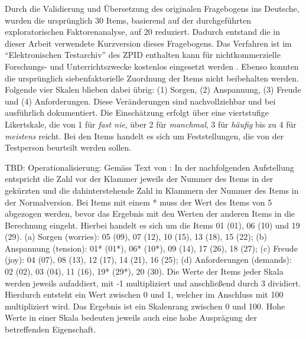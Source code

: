 Durch die Validierung und Übersetzung des originalen Fragebogens ins Deutsche, wurden die ursprünglich 30 Items, basierend auf der durchgeführten exploratorischen Faktorenanalyse, auf 20 reduziert. Dadurch entstand die in dieser Arbeit verwendete Kurzversion dieses Fragebogens. Das Verfahren ist im \enquote{Elektronischen Testarchiv} des ZPID enthalten kann für nichtkommerzielle Forschungs- und Unterrichtszwecke kostenlos eingesetzt werden \cite{ZPID}. Ebenso konnten die ursprünglich siebenfaktorielle Zuordnung der Items nicht beibehalten werden. Folgende vier Skalen blieben dabei übrig: (1) Sorgen, (2) Anspannung, (3) Freude und (4) Anforderungen. Diese Veränderungen sind nachvollziehbar und bei  ausführlich dokumentiert. Die Einschätzung erfolgt über eine viertstufige Likertskale, die von 1 für \textit{fast nie}, über 2 für \textit{manchmal}, 3 für \textit{häufig} bis zu 4 für \textit{meistens} reicht. Bei den Items handelt es sich um Feststellungen, die von der Testperson beurteilt werden sollen. 

TBD: Operationalisierung:
Gemäss Text von : In der nachfolgenden Aufstellung entspricht die Zahl vor der Klammer jeweils der Nummer des Items in der gekürzten und die dahinterstehende Zahl in Klammern der Nummer des Items in der Normalversion. Bei Items mit einem * muss der Wert des Items von 5 abgezogen werden, bevor das Ergebnis mit den Werten der anderen Items in die Berechnung eingeht. Hierbei handelt es sich um die Items 01 (01), 06 (10) und 19 (29). 
(a) Sorgen (worries): 05 (09), 07 (12), 10 (15), 13 (18), 15 (22); 
(b) Anspannung (tension): 01* (01*), 06* (10*), 09 (14), 17 (26), 18 (27); 
(c) Freude (joy): 04 (07), 08 (13), 12 (17), 14 (21), 16 (25); 
(d) Anforderungen (demands): 02 (02), 03 (04), 11 (16), 19* (29*), 20 (30). 
Die Werte der Items jeder Skala werden jeweils aufaddiert, mit -1 multipliziert und anschließend durch 3 dividiert. Hierdurch entsteht ein Wert zwischen 0 und 1, welcher im Anschluss mit 100 multipliziert wird. Das Ergebnis ist ein Skalenrang zwischen 0 und 100. Hohe Werte in einer Skala bedeuten jeweils auch eine hohe Ausprägung der betreffenden Eigenschaft.

